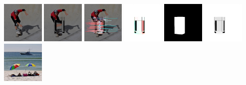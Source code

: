      \\
     \includegraphics[width=0.15\textwidth]{ch-tomnet/images/Dataset/render_gt_shape002141_0000_COCO_test2015_000000391594_ref}
     \includegraphics[width=0.15\textwidth]{ch-tomnet/images/Dataset/render_gt_shape002141_0000_COCO_test2015_000000391594}
     \includegraphics[width=0.15\textwidth]{ch-tomnet/images/Dataset/render_gt_shape0025_000000391594_cores}
     \includegraphics[width=0.15\textwidth]{ch-tomnet/images/Dataset/render_gt_shape0025_000000391594_flow}
     \includegraphics[width=0.15\textwidth]{ch-tomnet/images/Dataset/render_gt_shape0025_000000391594_mask}
     \includegraphics[width=0.15\textwidth]{ch-tomnet/images/Dataset/render_gt_shape002141_0000_COCO_test2015_000000391594_rho}
     \\
     \includegraphics[width=0.15\textwidth]{ch-tomnet/images/Dataset/render_gt_shape0160_COCO_val2014_000000391596_ref}
